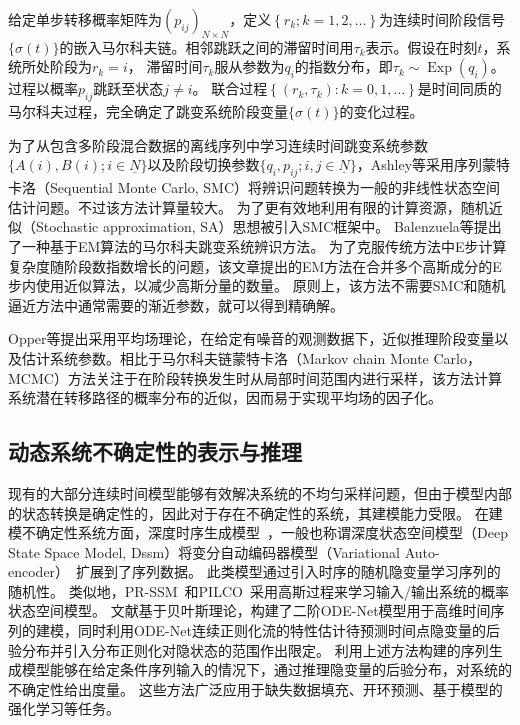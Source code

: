 给定单步转移概率矩阵为$\left(p_{i j}\right)_{N \times N}$，定义$\left\{r_k ; k=1,2, \ldots\right\}$为连续时间阶段信号$\{\sigma(t)\}$的嵌入马尔科夫链。相邻跳跃之间的滞留时间用$\tau_k$表示。假设在时刻$t$，系统所处阶段为$r_k=i$，
滞留时间$\tau _k$服从参数为$q_i$的指数分布，即$\tau_k\sim \operatorname{Exp}(q_i)$。
过程以概率$p_{ij}$跳跃至状态$j\neq i$。
联合过程$\left\{\left(r_k, \tau_k\right): k=0,1, \ldots\right\}$是时间同质的马尔科夫过程，完全确定了跳变系统阶段变量$\{\sigma(t)\}$的变化过程。



为了从包含多阶段混合数据的离线序列中学习连续时间跳变系统参数$\{A(i),B(i);i \in \underline{N}\}$以及阶段切换参数$\{q_i,p_{ij};i,j \in \underline{N}\}$，Ashley等采用序列蒙特卡洛（Sequential Monte Carlo, SMC）\cite{ashley2014sequential}将辨识问题转换为一般的非线性状态空间估计问题。不过该方法计算量较大。
为了更有效地利用有限的计算资源，随机近似（Stochastic approximation, SA）\cite{svensson2014identification,opper2007variational}思想被引入SMC框架中。
Balenzuela等提出了一种基于EM算法的马尔科夫跳变系统辨识方法\cite{balenzuela2022parameter}。
为了克服传统方法中E步计算复杂度随阶段数指数增长的问题，该文章提出的EM方法在合并多个高斯成分的E步内使用近似算法，以减少高斯分量的数量。
原则上，该方法不需要SMC和随机逼近方法中通常需要的渐近参数，就可以得到精确解。

Opper等\cite{opper2007variational}提出采用平均场理论，在给定有噪音的观测数据下，近似推理阶段变量以及估计系统参数。相比于马尔科夫链蒙特卡洛（Markov chain Monte Carlo， MCMC）方法关注于在阶段转换发生时从局部时间范围内进行采样，该方法计算系统潜在转移路径的概率分布的近似，因而易于实现平均场的因子化。

\subsection{动态系统不确定性的表示与推理}
现有的大部分连续时间模型能够有效解决系统的不均匀采样问题，但由于模型内部的状态转换是确定性的，因此对于存在不确定性的系统，其建模能力受限。
在建模不确定性系统方面，深度时序生成模型~\cite{Fraccaro2016,Chung2015,Karl2017}，一般也称谓深度状态空间模型（Deep State Space Model, Dssm）将变分自动编码器模型（Variational Auto-encoder）~\cite{kingma2013auto}扩展到了序列数据。
此类模型通过引入时序的随机隐变量学习序列的随机性。
类似地，PR-SSM~\cite{doerr2018probabilistic}和PILCO~\cite{deisenroth2011pilco}采用高斯过程来学习输入/输出系统的概率状态空间模型。
文献\cite{Yildiz2019}基于贝叶斯理论，构建了二阶ODE-Net模型用于高维时间序列的建模，同时利用ODE-Net连续正则化流的特性估计待预测时间点隐变量的后验分布并引入分布正则化对隐状态的范围作出限定。
利用上述方法构建的序列生成模型能够在给定条件序列输入的情况下，通过推理隐变量的后验分布，对系统的不确定性给出度量。
这些方法广泛应用于缺失数据填充\cite{Fraccaro2017}、开环预测\cite{Hafner2019}、基于模型的强化学习等任务\cite{Hafner2019}。

